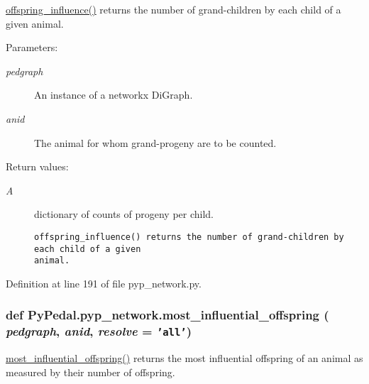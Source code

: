 \hyperlink{namespacePyPedal_1_1pyp__network_ae9a5f01ef47449a3d35fb9fa8c12c39}{offspring\_\-influence()} returns the number of grand-children by each child of a given animal. 

\begin{Desc}
\item[Parameters:]
\begin{description}
\item[{\em pedgraph}]An instance of a networkx Di\-Graph. \item[{\em anid}]The animal for whom grand-progeny are to be counted. \end{description}
\end{Desc}
\begin{Desc}
\item[Return values:]
\begin{description}
\item[{\em A}]dictionary of counts of progeny per child.

\footnotesize\begin{verbatim}offspring_influence() returns the number of grand-children by each child of a given
animal.
\end{verbatim}
\normalsize
 \end{description}
\end{Desc}


Definition at line 191 of file pyp\_\-network.py.\hypertarget{namespacePyPedal_1_1pyp__network_4371fc02c48e328c85b9b5d612735bff}{
\subsubsection[most\_\-influential\_\-offspring]{\setlength{\rightskip}{0pt plus 5cm}def Py\-Pedal.pyp\_\-network.most\_\-influential\_\-offspring ( {\em pedgraph},  {\em anid},  {\em resolve} = {\tt 'all'})}}
\label{namespacePyPedal_1_1pyp__network_4371fc02c48e328c85b9b5d612735bff}


\hyperlink{namespacePyPedal_1_1pyp__network_4371fc02c48e328c85b9b5d612735bff}{most\_\-influential\_\-offspring()} returns the most influential offspring of an animal as measured by their number of offspring. 

